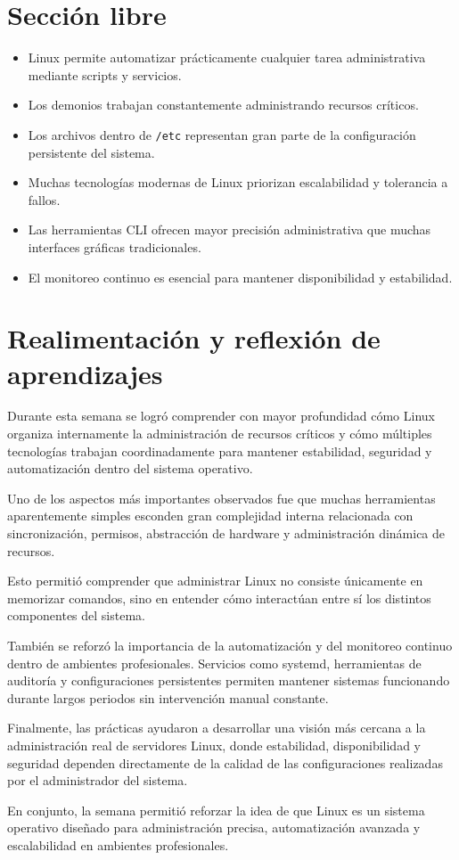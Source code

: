 \documentclass[11pt, letterpaper]{article}
\begin{document}
\section{Sección libre}
\label{sec:org523e7fa}

\begin{itemize}
\item Linux permite automatizar prácticamente cualquier tarea administrativa mediante scripts y servicios.
\item Los demonios trabajan constantemente administrando recursos críticos.
\item Los archivos dentro de \texttt{/etc} representan gran parte de la configuración persistente del sistema.
\item Muchas tecnologías modernas de Linux priorizan escalabilidad y tolerancia a fallos.
\item Las herramientas CLI ofrecen mayor precisión administrativa que muchas interfaces gráficas tradicionales.
\item El monitoreo continuo es esencial para mantener disponibilidad y estabilidad.
\end{itemize}

\newpage
\section{Realimentación y reflexión de aprendizajes}
\label{sec:orgf7bc584}

Durante esta semana se logró comprender con mayor profundidad cómo Linux organiza internamente la administración de recursos críticos y cómo múltiples tecnologías trabajan coordinadamente para mantener estabilidad, seguridad y automatización dentro del sistema operativo.

Uno de los aspectos más importantes observados fue que muchas herramientas aparentemente simples esconden gran complejidad interna relacionada con sincronización, permisos, abstracción de hardware y administración dinámica de recursos.

Esto permitió comprender que administrar Linux no consiste únicamente en memorizar comandos, sino en entender cómo interactúan entre sí los distintos componentes del sistema.

También se reforzó la importancia de la automatización y del monitoreo continuo dentro de ambientes profesionales. Servicios como systemd, herramientas de auditoría y configuraciones persistentes permiten mantener sistemas funcionando durante largos periodos sin intervención manual constante.

Finalmente, las prácticas ayudaron a desarrollar una visión más cercana a la administración real de servidores Linux, donde estabilidad, disponibilidad y seguridad dependen directamente de la calidad de las configuraciones realizadas por el administrador del sistema.

En conjunto, la semana permitió reforzar la idea de que Linux es un sistema operativo diseñado para administración precisa, automatización avanzada y escalabilidad en ambientes profesionales.
\end{document}
